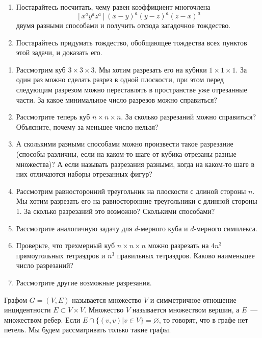\begin{enumerate}
\item Постарайтесь посчитать, чему равен коэффициент многочлена
	$$[x^ay^az^a](x-y)^a(y-z)^a(z-x)^a$$
двумя разными способами и получить отсюда загадочное тождество.

\item Постарайтесь придумать тождество, обобщающее тождества всех пунктов этой задачи, и доказать его. 



\end{enumerate}



\begin{enumerate}
\item Рассмотрим куб $3\times 3\times 3$. Мы хотим разрезать его на кубики $1\times 1\times 1$. За один раз можно сделать разрез в одной плоскости, при этом перед следующим разрезом можно переставлять в пространстве уже отрезанные части. За какое минимальное число разрезов можно справиться?
\item Рассмотрите теперь куб $n\times n\times n$. За сколько разрезаний можно справиться? Объясните, почему за меньшее число нельзя?
\item А сколькими разными способами можно произвести такое разрезание (способы различны, если на каком-то шаге от кубика отрезаны разные множества)? А если называть разрезания разными, когда на каком-то шаге в них отличаются наборы отрезанных фигур?
\item Рассмотрим равносторонний треугольник на плоскости с длиной стороны $n$. Мы хотим разрезать его на равносторонние треугольники с длинной стороны 1. За сколько разрезаний это возможно? Сколькими способами?
\item Рассмотрите аналогичную задачу для $d$-мерного куба и $d$-мерного симплекса.
\item Проверьте, что трехмерный куб $n\times n \times n$ можно разрезать на $4n^3$ прямоугольных тетраэдров и $n^3$ правильных тетраэдров. Каково наименьшее число разрезаний?
\item Рассмотрите другие возможные разрезания. 
\end{enumerate}



 Графом $G = (V,E)$ называется множество $V$ и симметричное отношение инцидентности $E\subset V\times V$. Множество $V$ называется множеством вершин, а $E$~— множеством ребер. Если $E\cap \{(v,v)|v\in V\} = \varnothing$, то говорят, что в графе нет петель. Мы будем рассматривать только такие графы.

